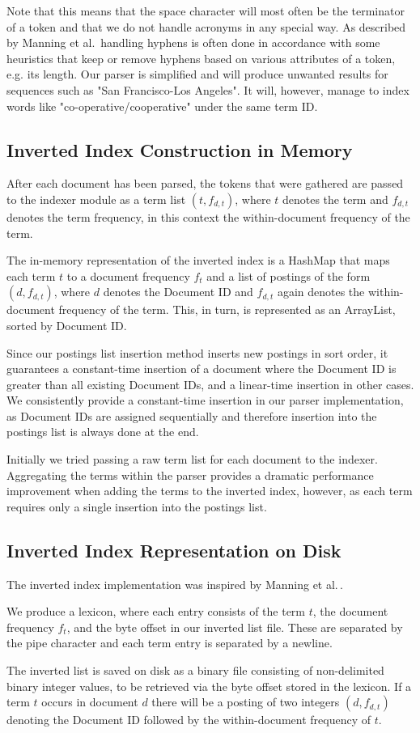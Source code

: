 Note that this means that the space character will most often be the terminator of a token and that we do not handle acronyms in any special way. As described by Manning et al.\,\cite[p. 24]{manning2008introduction} handling hyphens is often done in accordance with some heuristics that keep or remove hyphens based on various attributes of a token, e.g. its length. Our parser is simplified and will produce unwanted results for sequences such as "San Francisco-Los Angeles". It will, however, manage to index words like "co-operative/cooperative" under the same term ID.

\subsection*{Inverted Index Construction in Memory}

After each document has been parsed, the tokens that were gathered are passed to the indexer module as a term list $(t, f_{d,t})$, where $t$ denotes the term and $f_{d,t}$ denotes the term frequency, in this context the within-document frequency of the term.

The in-memory representation of the inverted index is a HashMap that maps each term $t$ to a document frequency $f_t$ and a list of postings of the form $(d, f_{d,t})$, where $d$ denotes the Document ID and $f_{d,t}$ again denotes the within-document frequency of the term. This, in turn, is represented as an ArrayList, sorted by Document ID.

Since our postings list insertion method inserts new postings in sort order, it guarantees a constant-time insertion of a document where the Document ID is greater than all existing Document IDs, and a linear-time insertion in other cases. We consistently provide a constant-time insertion in our parser implementation, as Document IDs are assigned sequentially and therefore insertion into the postings list is always done at the end.

Initially we tried passing a raw term list for each document to the indexer. Aggregating the terms within the parser provides a dramatic performance improvement when adding the terms to the inverted index, however, as each term requires only a single insertion into the postings list.

\subsection*{Inverted Index Representation on Disk}

The inverted index implementation was inspired by Manning et al.\,\cite{manning2008introduction}.

We produce a lexicon, where each entry consists of the term $t$, the document frequency $f_t$, and the byte offset in our inverted list file. These are separated by the pipe character and each term entry is separated by a newline.

The inverted list is saved on disk as a binary file consisting of non-delimited binary integer values, to be retrieved via the byte offset stored in the lexicon. If a term $t$ occurs in document $d$ there will be a posting of two integers $(d, f_{d,t})$ denoting the Document ID followed by the within-document frequency of $t$.

